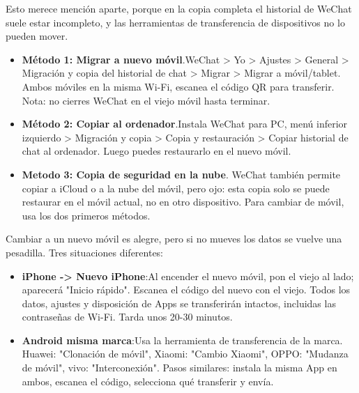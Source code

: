 
Esto merece mención aparte, porque en la copia completa el historial de WeChat suele estar incompleto, y las herramientas de transferencia de dispositivos no lo pueden mover.

\begin{itemize}
  \item \textbf{Método 1: Migrar a nuevo móvil}.WeChat > Yo > Ajustes > General > Migración y copia del historial de chat > Migrar > Migrar a móvil/tablet. Ambos móviles en la misma Wi-Fi, escanea el código QR para transferir. Nota: no cierres WeChat en el viejo móvil hasta terminar.
  \item \textbf{Método 2: Copiar al ordenador}.Instala WeChat para PC, menú inferior izquierdo > Migración y copia > Copia y restauración > Copiar historial de chat al ordenador. Luego puedes restaurarlo en el nuevo móvil.
  \item \textbf{Metodo 3: Copia de seguridad en la nube}. WeChat también permite copiar a iCloud o a la nube del móvil, pero ojo: esta copia solo se puede restaurar en el móvil actual, no en otro dispositivo. Para cambiar de móvil, usa los dos primeros métodos.
\end{itemize}


Cambiar a un nuevo móvil es alegre, pero si no mueves los datos se vuelve una pesadilla. Tres situaciones diferentes:


\begin{itemize}
  \item \textbf{iPhone -> Nuevo iPhone}:Al encender el nuevo móvil, pon el viejo al lado; aparecerá "Inicio rápido". Escanea el código del nuevo con el viejo. Todos los datos, ajustes y disposición de Apps se transferirán intactos, incluidas las contraseñas de Wi-Fi. Tarda unos 20-30 minutos.
  \item \textbf{Android misma marca}:Usa la herramienta de transferencia de la marca. Huawei: "Clonación de móvil", Xiaomi: "Cambio Xiaomi", OPPO: "Mudanza de móvil", vivo: "Interconexión". Pasos similares: instala la misma App en ambos, escanea el código, selecciona qué transferir y envía.
\end{itemize}



